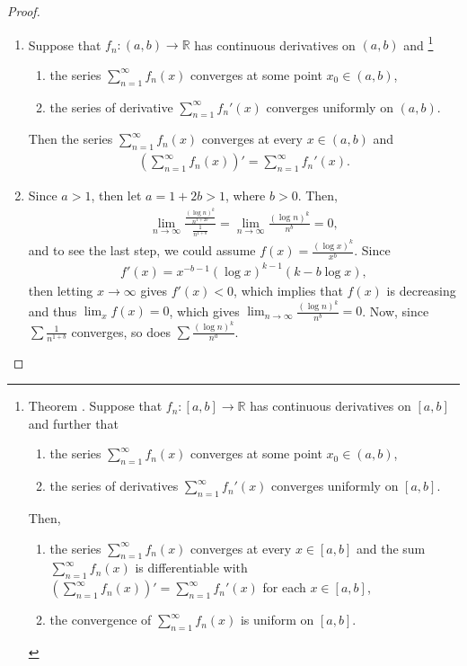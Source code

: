 \documentclass[11pt]{article}
\makeatletter
\theoremstyle{definition}
\numberwithin{equation}{subsection}
\newenvironment{intheorem}[1][]
  {%
   \refstepcounter{theorem}%
   {\the\thm@headfont Theorem \thetheorem\@ifempty{#1}{}{ (#1)}.}%
   \the\thm@bodyfont
  }%
  {\par}
\makeatother
\begin{document}
\begin{proof}
~\begin{enumerate}[label=(\alph*)]
    \item Suppose that $f_n:(a,b) \to \mathbb{R}$ has continuous derivatives on $(a,b)$ and \footnote{\begin{intheorem}{\rm \cite{10}}
    Suppose that $f_n:[a,b] \to \mathbb{R}$ has continuous derivatives on $[a,b]$ and further that
    \begin{enumerate}[label=(\alph*)]
        \item the series $\sum^\infty_{n=1} f_n(x)$ converges at some point $x_0 \in (a, b)$,
        
        \item the series of derivatives $\sum^\infty_{n=1} f_n'(x)$ converges uniformly on $[a,b]$.
    \end{enumerate}
    Then,
    \begin{enumerate}[label=(\alph*)]
        \item the series $\sum^\infty_{n=1} f_n(x)$ converges at every $x \in [a,b]$ and the sum $\sum^\infty_{n=1} f_n(x)$ is differentiable with $\left( \sum^\infty_{n=1} f_n(x) \right)' = \sum^\infty_{n=1} f_n'(x)$ for each $x \in [a,b]$,
        
        \item the convergence of $\sum^\infty_{n=1} f_n(x)$ is uniform on $[a,b]$.
    \end{enumerate}
    \end{intheorem}}
    \begin{enumerate}[label=\arabic*)]
        \item the series $\sum^\infty_{n=1} f_n(x)$ converges at some point $x_0 \in (a, b)$,
        
        \item the series of derivative $\sum^\infty_{n=1} f_n'(x)$ converges uniformly on $(a,b)$.
    \end{enumerate}
    Then the series $\sum^\infty_{n=1} f_n(x)$ converges at every $x \in (a,b)$ and
    \begin{align*}
        \left(\sum^\infty_{n=1}f_n(x) \right)' = \sum^\infty_{n=1} f_n'(x).
    \end{align*}
    
    \item Since $a > 1$, then let $a = 1 + 2b > 1$, where $b > 0$. Then,
    \begin{align*}
        \lim_{n\to\infty} \frac{\frac{(\log n)^k}{n^{1+2b}}}{\frac{1}{n^{1+b}}} = \lim_{n\to\infty} \frac{(\log n)^k}{n^b} = 0,
    \end{align*}
    and to see the last step, we could assume $f(x) = \frac{(\log x)^k}{x^b}$. Since 
    \begin{align*}
        f'(x) = x^{-b-1} (\log x)^{k-1} (k - b \log x),
    \end{align*}
    then letting $x \to \infty$ gives $f'(x) < 0$, which implies that $f(x)$ is decreasing and thus $\lim_{x} f(x) = 0$, which gives $\lim_{n\to\infty} \frac{(\log n)^k}{n^b} = 0$. Now, since $\sum \frac{1}{n^{1+b}}$ converges, so does $\sum \frac{(\log n)^k}{n^a}$.
    

\end{enumerate}
\end{proof}
\end{document}
